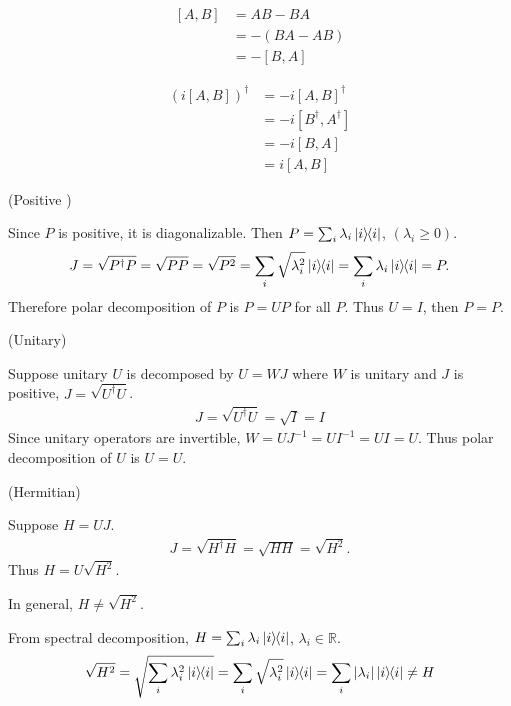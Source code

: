 \begin{align*}
	\left[A, B\right] &= AB - BA\\
		&= - (BA - AB)\\
		&= -\left[B, A\right]
\end{align*}



\begin{align*}
	\left(i \left[A, B\right] \right)^\dagger &= -i \left[A, B\right]^\dagger\\
		&= -i \left[B^\dagger, A^\dagger \right]\\
		&= -i \left[B, A \right]\\
		&= i \left[A, B\right]
\end{align*}




(Positive )

 Since $P$ is positive, it is diagonalizable. Then $P = \sum_i \lambda_i \ket{i}\hspace{-1mm} \bra{i}$, $(\lambda_i \geq 0)$.
\begin{align*}
	J = \sqrt{P^\dagger P} = \sqrt{P P} = \sqrt{P^2} = \sum_i \sqrt{\lambda_i^2} \ket{i}\hspace{-1mm} \bra{i} = \sum_i \lambda_i \ket{i}\hspace{-1mm} \bra{i} = P.
\end{align*}
 Therefore polar decomposition of $P$ is $P = UP$ for all $P$.
 Thus $U = I$, then $P = P$.


\vspace{5mm}
(Unitary)

Suppose unitary $U$ is decomposed by $U = WJ$ where $W$ is unitary and $J$ is positive, $J = \sqrt{U^\dagger U}$.
\begin{align*}
	J = \sqrt{U^\dagger U} = \sqrt{I} = I
\end{align*}
Since unitary operators are invertible, $W = UJ^{-1} = UI^{-1} = UI = U$.
Thus polar decomposition of $U$ is $U = U$.


\vspace{5mm}
(Hermitian)

Suppose $H = UJ$.
\begin{align*}
	J = \sqrt{H^\dagger H} = \sqrt{HH} = \sqrt{H^2}.
\end{align*}
Thus $H = U\sqrt{H^2}$.

\begin{screen}
	In general, $H \neq \sqrt{H^2}$.

	From spectral decomposition, $H = \sum_i \lambda_i \ket{i}\hspace{-1mm} \bra{i}$, $\lambda_i \in \mathds{R}$.
	\begin{align*}
		 \sqrt{H^2} = \sqrt{ \sum_i \lambda_i^2 \ket{i}\hspace{-1mm} \bra{i} }
		 =
 		\sum_i
 			\sqrt{
 				\lambda_i^2
			} \ket{i}\hspace{-1mm} \bra{i}
		= \sum_i | \lambda_i | \ket{i}\hspace{-1mm} \bra{i} \neq H
	\end{align*}
\end{screen}


